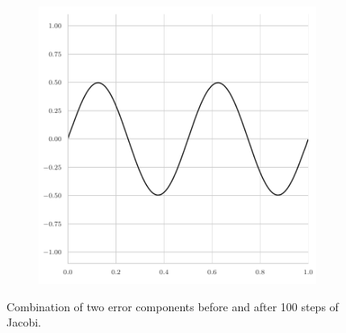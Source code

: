 \begin{figure}
\begin{subfigure}[b]{0.45\textwidth}
		\includegraphics[width=\textwidth]{figures/final_error_jacobi_combined.pdf}
\end{subfigure}
	\caption{Combination of two error components before and after 100 steps of Jacobi.}
\label{fig:combined-error-jacobi}
\end{figure}
